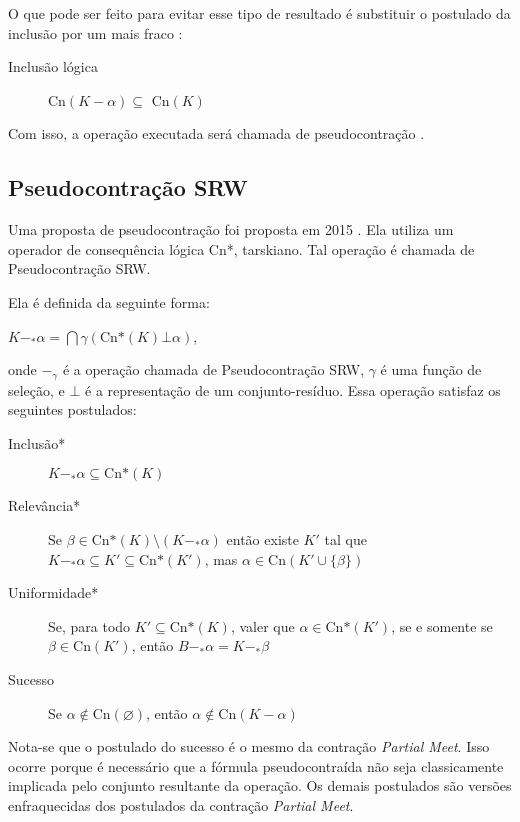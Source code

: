 O que pode ser feito para evitar esse tipo de resultado é substituir o postulado da inclusão por um mais fraco \cite{revisaoHansson3}:

\begin{description}
	\item[Inclusão lógica] Cn$(K - \alpha) \subseteq $ Cn$(K)$ 
\end{description}

Com isso, a operação executada será chamada de pseudocontração \cite{revisaoHansson4}.
\subsection{Pseudocontração SRW}

Uma proposta de pseudocontração foi proposta em 2015 \cite{revisaoSantos}. Ela utiliza um operador de consequência lógica Cn*, tarskiano. Tal operação é chamada de Pseudocontração SRW. 

Ela é definida da seguinte forma:

\begin{center}
	$ K -_* \alpha = \bigcap \gamma(\text{Cn*}(K) \bot \alpha) $,
\end{center}

onde $ -_{\gamma} $ é a operação chamada de Pseudocontração SRW, $ \gamma $ é uma função de seleção, e $ \bot $ é a representação de um conjunto-resíduo. Essa operação satisfaz os seguintes postulados:

\begin{description}
	\item[Inclusão*] $ K -_* \alpha \subseteq \text{Cn*}(K)$
	\item[Relevância*] Se $ \beta \in \text{Cn*}(K) \setminus (K -_* \alpha) $ então existe  $ K' $ tal que $ K -_* \alpha \subseteq K' \subseteq \text{Cn*}(K') $, mas $ \alpha \in \text{Cn}(K' \cup \{\beta\}) $
	\item[Uniformidade*] Se, para todo $K' \subseteq \text{Cn*}(K) $, valer que $ \alpha \in \text{Cn*}(K') $, se e somente se $ \beta \in \text{Cn}(K') $, então $ B -_* \alpha = K -_* \beta $
	\item[Sucesso] Se $ \alpha \notin \text{Cn}(\varnothing) $, então $ \alpha \notin \text{Cn}(K - \alpha) $
\end{description}

Nota-se que o postulado do sucesso é o mesmo da contração \textit{Partial Meet}. Isso ocorre porque é necessário que a fórmula pseudocontraída não seja classicamente implicada pelo conjunto resultante da operação. Os demais postulados são versões enfraquecidas dos postulados da contração \textit{Partial Meet}.